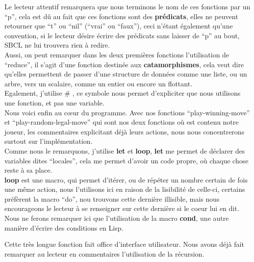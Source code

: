 \documentclass[a4paper, 12pt]{article}
\numberwithin{equation}{subsection}
\begin{document}
Le lecteur attentif remarquera que nous terminons le nom de ces fonctions par un ``p'', cela est dû au fait que ces fonctions sont des {\bf prédicats}, elles ne peuvent retourner que ``t'' ou ``nil'' (``vrai'' ou ``faux''), ceci n'étant également qu'une convention, si le lecteur désire écrire des prédicats sans laisser de ``p'' au bout, SBCL ne lui trouvera rien à redire.\\

Aussi, on peut remarquer dans les deux premières fonctions l'utilisation de ``reduce'', il s'agit d'une fonction destinée aux {\bf catamorphismes}, cela veut dire qu'elles permettent de passer d'une structure de données comme une liste, ou un arbre, vers un scalaire, comme un entier ou encore un flottant. \\

Egalement, j'utilise \# , ce symbole nous permet d'expliciter que nous utilisons une fonction, et pas une variable.\\

Nous voici enfin au cœur du programme. Avec nos fonctions ``play-winning-move'' et ``play-random-legal-move'' qui sont nos deux fonctions où est contenu notre joueur, les commentaires explicitant déjà leurs actions, nous nous concentrerons surtout sur l'implémentation. \\

Comme nous le remarquons, j'utilise {\bf let} et {\bf loop}, {\bf let} me permet de déclarer des variables dites ``locales'', cela me permet d'avoir un code propre, où chaque chose reste à sa place. \\

{\bf loop} est une macro, qui permet d'itérer, ou de répéter un nombre certain de fois une même action, nous l'utilisons ici en raison de la lisibilité de celle-ci, certains préfèrent la macro ``do'', nou trouvons cette dernière illisible, mais nous encourageons le lecteur à se renseigner sur cette dernière si le coeur lui en dit.\\

Nous ne ferons remarquer ici que l'utilisation de la macro {\bf cond}, une autre manière d'écrire des conditions en Lisp.

Cette très longue fonction fait office d'interface utilisateur. Nous avons déjà fait remarquer au lecteur en commentaires l'utilisation de la récursion. \\
\end{document}
